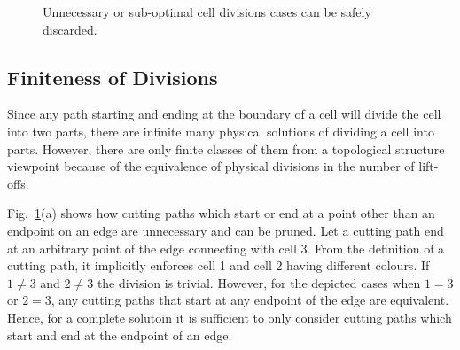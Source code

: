 \documentclass[journal]{IEEEtran}
\begin{document}
\begin{figure}[t]
\centering
{}
\caption{Unnecessary or sub-optimal cell divisions cases can be safely discarded.}
\label{figproof}
\end{figure}

\subsection{Finiteness of Divisions}
\label{subsectionproof}
Since any path starting and ending at the boundary of a cell will divide the cell into two parts, there are infinite many physical solutions of dividing a cell into parts. However, there are only finite classes of them from a topological structure viewpoint 
because of the equivalence of physical divisions in the number of lift-offs. 

Fig.~\ref{figproof}(a) shows how cutting paths which start or end at a point other than an endpoint on an edge are unnecessary and can be pruned. Let a cutting path end at an arbitrary point of the edge connecting with cell 3. From the definition of a cutting path, it implicitly enforces cell 1 and cell 2 having different colours.  
If $1\neq 3$ and $2\neq 3$ the division is trivial. 
However, for the depicted cases when $1=3$ or $2=3$, any cutting paths that start at any endpoint of the edge are equivalent. Hence, for a complete solutoin it is sufficient to only consider cutting paths which start and end at the endpoint of an edge.  
\end{document}
